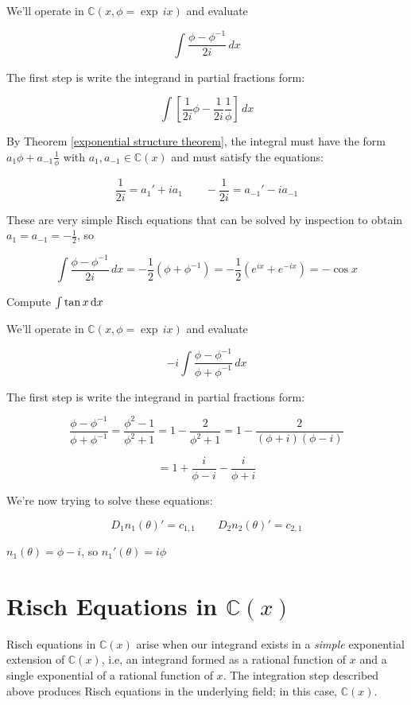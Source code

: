 We'll operate in ${\mathbb C}(x, \phi = \exp \,ix)$ and evaluate

$$\int \frac{\phi - \phi^{-1}}{2i} \,dx$$

The first step is write the integrand in partial fractions form:

$$\int \left[ \frac{1}{2i} \phi - \frac{1}{2i} \frac{1}{\phi} \right] \,dx $$

By Theorem \ref{exponential structure theorem}, the integral must have the
form $a_1 \phi + a_{-1} \frac{1}{\phi}$ with $a_1, a_{-1} \in {\mathbb
C}(x)$ and must satisfy the equations:

$$\frac{1}{2i} = a_1' + i a_1 \qquad - \frac{1}{2i} = a_{-1}' - i a_{-1}$$ 

These are very simple Risch equations that can be solved by inspection
to obtain $a_1 = a_{-1} = -\frac{1}{2}$, so

$$\int \frac{\phi - \phi^{-1}}{2i} \,dx = -\frac{1}{2}(\phi + \phi^{-1})
 = -\frac{1}{2}(e^{ix} + e^{-ix}) = -\cos x$$

\endexample

\vfil\eject

\example Compute $\int \tan x \, {\rm d}x$

We'll operate in ${\mathbb C}(x, \phi = \exp \,ix)$ and evaluate

$$-i \int \frac{\phi - \phi^{-1}}{\phi + \phi^{-1}} \,dx$$

The first step is write the integrand in partial fractions form:

$$\frac{\phi - \phi^{-1}}{\phi + \phi^{-1}} = \frac{\phi^2 - 1}{\phi^2 + 1}
= 1 - \frac{2}{\phi^2 + 1}
= 1 - \frac{2}{(\phi + i)(\phi - i)} $$

$$ = 1 + \frac{i}{\phi - i} - \frac{i}{\phi + i} $$

We're now trying to solve these equations:

$$ D_1 n_1(\theta)' = c_{1,1} \qquad D_2 n_2(\theta)' = c_{2,1}$$

$n_1(\theta) = \phi -i$, so $n_1'(\theta) = i \phi$

\endexample

\vfill\eject
\section{Risch Equations in ${\mathbb C}(x)$}

Risch equations in ${\mathbb C}(x)$ arise when our integrand exists in
a {\it simple} exponential extension of ${\mathbb C}(x)$,
i.e, an integrand formed as a rational function of $x$ and a
single exponential of a rational function of $x$.  The integration step
described above produces Risch equations in the underlying field;
in this case, ${\mathbb C}(x)$.

